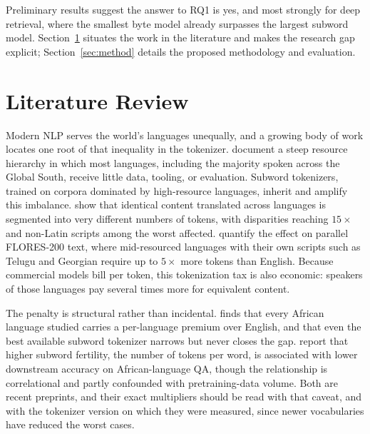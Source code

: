 \documentclass[11pt]{article}
\begin{document}
\noindent
Preliminary results suggest the answer to RQ1 is yes, and most strongly for deep retrieval, where the
smallest byte model already surpasses the largest subword model. Section~\ref{sec:related} situates
the work in the literature and makes the research gap explicit; Section~\ref{sec:method} details the
proposed methodology and evaluation.

\section{Literature Review}
\label{sec:related}

Modern NLP serves the world's languages unequally, and a growing body of work locates one root of
that inequality in the tokenizer. \citet{joshi2020} document a steep resource hierarchy in which most
languages, including the majority spoken across the Global South, receive little data, tooling, or
evaluation. Subword tokenizers, trained on corpora dominated by high-resource languages, inherit and
amplify this imbalance. \citet{petrov2023} show that identical content translated across languages is
segmented into very different numbers of tokens, with disparities reaching $15\times$ and non-Latin
scripts among the worst affected. \citet{ahia2023} quantify the effect on parallel FLORES-200 text,
where mid-resourced languages with their own scripts such as Telugu and Georgian require up to
$5\times$ more tokens than English. Because commercial models bill per token, this tokenization tax is
also economic: speakers of those languages pay several times more for equivalent content.

The penalty is structural rather than incidental. \citet{somide2026} finds that every African
language studied carries a per-language premium over English, and that even the best available subword
tokenizer narrows but never closes the gap. \citet{lundin2025tokentax} report that higher subword
fertility, the number of tokens per word, is associated with lower downstream accuracy on
African-language QA, though the relationship is correlational and partly confounded with
pretraining-data volume. Both are recent preprints, and their exact multipliers should be read with
that caveat, and with the tokenizer version on which they were measured, since newer vocabularies have
reduced the worst cases.
\end{document}
